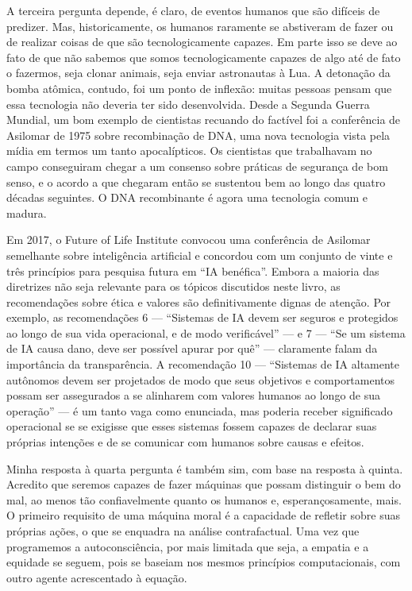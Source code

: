 \documentclass[11pt,a5paper,twoside]{book}
\begin{document}
A terceira pergunta depende, é claro, de eventos humanos que são difíceis de predizer. Mas, historicamente, os humanos raramente se abstiveram de fazer ou de realizar coisas de que são tecnologicamente capazes. Em parte isso se deve ao fato de que não sabemos que somos tecnologicamente capazes de algo até de fato o fazermos, seja clonar animais, seja enviar astronautas à Lua. A detonação da bomba atômica, contudo, foi um ponto de inflexão: muitas pessoas pensam que essa tecnologia não deveria ter sido desenvolvida. Desde a Segunda Guerra Mundial, um bom exemplo de cientistas recuando do factível foi a conferência de Asilomar de 1975 sobre recombinação de DNA, uma nova tecnologia vista pela mídia em termos um tanto apocalípticos. Os cientistas que trabalhavam no campo conseguiram chegar a um consenso sobre práticas de segurança de bom senso, e o acordo a que chegaram então se sustentou bem ao longo das quatro décadas seguintes. O DNA recombinante é agora uma tecnologia comum e madura.

Em 2017, o Future of Life Institute convocou uma conferência de Asilomar semelhante sobre inteligência artificial e concordou com um conjunto de vinte e três princípios para pesquisa futura em “IA benéfica”. Embora a maioria das diretrizes não seja relevante para os tópicos discutidos neste livro, as recomendações sobre ética e valores são definitivamente dignas de atenção. Por exemplo, as recomendações 6 — “Sistemas de IA devem ser seguros e protegidos ao longo de sua vida operacional, e de modo verificável” — e 7 — “Se um sistema de IA causa dano, deve ser possível apurar por quê” — claramente falam da importância da transparência. A recomendação 10 — “Sistemas de IA altamente autônomos devem ser projetados de modo que seus objetivos e comportamentos possam ser assegurados a se alinharem com valores humanos ao longo de sua operação” — é um tanto vaga como enunciada, mas poderia receber significado operacional se se exigisse que esses sistemas fossem capazes de declarar suas próprias intenções e de se comunicar com humanos sobre causas e efeitos.

Minha resposta à quarta pergunta é também sim, com base na resposta à quinta. Acredito que seremos capazes de fazer máquinas que possam distinguir o bem do mal, ao menos tão confiavelmente quanto os humanos e, esperançosamente, mais. O primeiro requisito de uma máquina moral é a capacidade de refletir sobre suas próprias ações, o que se enquadra na análise contrafactual. Uma vez que programemos a autoconsciência, por mais limitada que seja, a empatia e a equidade se seguem, pois se baseiam nos mesmos princípios computacionais, com outro agente acrescentado à equação.
\end{document}
